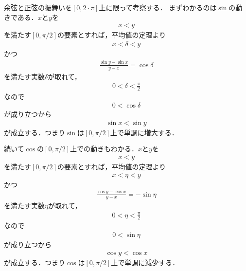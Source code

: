 	余弦と正弦の振舞いを$[0,2 \cdot \pi]$上に限って考察する．
	まずわかるのは$\sin$の動きである．$x$と$y$を
	\begin{align}
		x < y
	\end{align}
	を満たす$[0,\pi/2]$の要素とすれば，平均値の定理より
	\begin{align}
		x < \delta < y
	\end{align}
	かつ
	\begin{align}
		\frac{\sin{y} - \sin{x}}{y - x} = \cos{\delta}
	\end{align}
	を満たす実数$\delta$が取れて，
	\begin{align}
		0 < \delta < \frac{\pi}{2}
	\end{align}
	なので
	\begin{align}
		0 < \cos{\delta}
	\end{align}
	が成り立つから
	\begin{align}
		\sin{x} < \sin{y}
	\end{align}
	が成立する．つまり$\sin$は$[0,\pi/2]$上で単調に増大する．
	
	
	続いて$\cos$の$[0,\pi/2]$上での動きもわかる．$x$と$y$を
	\begin{align}
		x < y
	\end{align}
	を満たす$[0,\pi/2]$の要素とすれば，平均値の定理より
	\begin{align}
		x < \eta < y
	\end{align}
	かつ
	\begin{align}
		\frac{\cos{y} - \cos{x}}{y - x} = -\sin{\eta}
	\end{align}
	を満たす実数$\eta$が取れて，
	\begin{align}
		0 < \eta < \frac{\pi}{2}
	\end{align}
	なので
	\begin{align}
		0 < \sin{\eta}
	\end{align}
	が成り立つから
	\begin{align}
		\cos{y} < \cos{x}
	\end{align}
	が成立する．つまり$\cos$は$[0,\pi/2]$上で単調に減少する．
	
